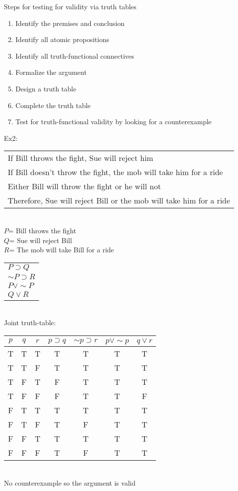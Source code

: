 Steps for testing for validity via truth tables
\begin{enumerate}
    \item Identify the premises and conclusion
    \item Identify all atomic propositions
    \item Identify all truth-functional connectives
    \item Formalize the argument
    \item Design a truth table
    \item Complete the truth table
    \item Test for truth-functional validity by looking for a counterexample
\end{enumerate}
Ex2:\\
\begin{tabular}{p{11cm}}
    If Bill throws the fight, Sue will reject him\\
    If Bill doesn't throw the fight, the mob will take him for a ride\\
    Either Bill will throw the fight or he will not\\
    \hline
    Therefore, Sue will reject Bill or the mob will take him for a ride
\end{tabular}\\
$P$= Bill throws the fight\\
$Q$= Sue will reject Bill\\
$R$= The mob will take Bill for a ride\\
\begin{tabular}{p{2cm}}
    $P\supset Q$\\
    $\sim P\supset R$\\
    $P\vee \sim P$\\
    \hline
    $Q\vee R$
\end{tabular}\\
Joint truth-table:\\
\begin{tabular}{c|c|c||c|c|c||c}
    $p$ & $q$ & $r$ & $p\supset q$ & $\sim p\supset r$ & $p\vee \sim p$ & $q \vee r$\\
    \hline
    T & T & T & T & T & T & T\\
    T & T & F & T & T & T & T\\
    T & F & T & F & T & T & T\\
    T & F & F & F & T & T & F\\
    F & T & T & T & T & T & T\\
    F & T & F & T & F & T & T\\
    F & F & T & T & T & T & T\\
    F & F & F & T & F & T & T
\end{tabular}\\
No counterexample so the argument is valid\\

